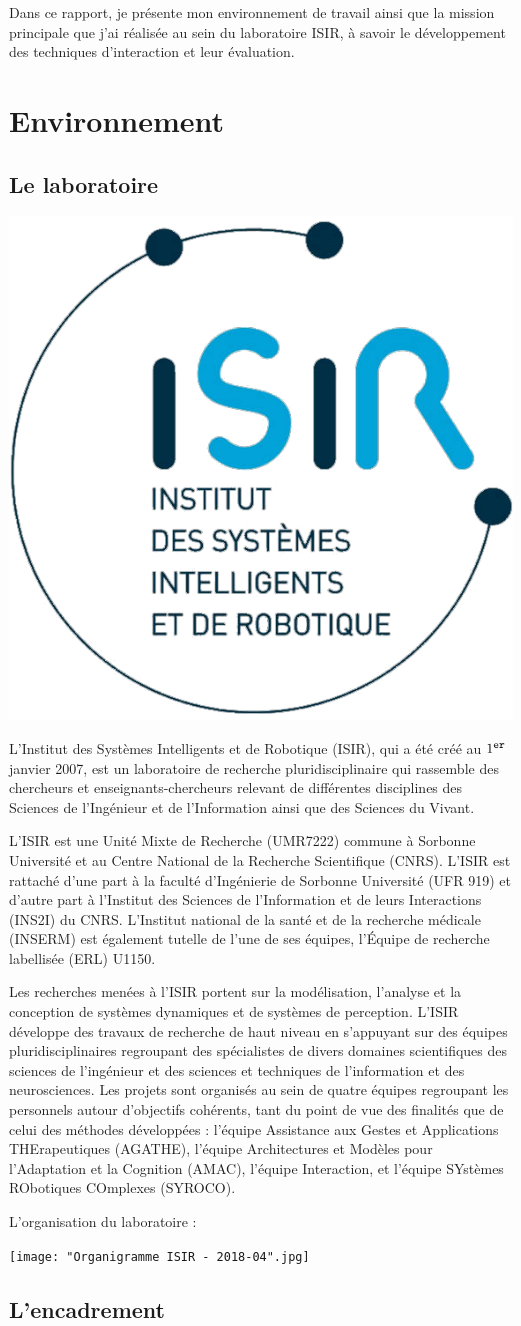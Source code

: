 \documentclass[12pt,a4paper]{article}
\begin{document}
Dans ce rapport, je présente mon environnement de travail ainsi que la mission principale que j'ai réalisée au sein du laboratoire ISIR, à savoir le développement des techniques d'interaction et leur évaluation.
\section{Environnement}
\subsection{Le laboratoire}
\begin{center}
	\includegraphics[width=.3\linewidth]{ISIR.png}
\end{center}
L'Institut des Systèmes Intelligents et de Robotique (ISIR), qui a été créé au $1^{\texttt{\footnotesize er}}$ janvier 2007, est un laboratoire de recherche pluridisciplinaire qui rassemble des chercheurs et enseignants-chercheurs relevant de différentes disciplines des Sciences de l’Ingénieur et de l’Information ainsi que des Sciences du Vivant.

L’ISIR est une Unité Mixte de Recherche (UMR7222) commune à Sorbonne Université et au Centre National de la Recherche Scientifique (CNRS). L'ISIR est rattaché d’une part à la faculté d’Ingénierie de Sorbonne Université (UFR 919) et d’autre part à l’Institut des Sciences de l'Information et de leurs Interactions (INS2I) du CNRS. L’Institut national de la santé et de la recherche médicale (INSERM) est également tutelle de l'une de ses équipes, l’Équipe de recherche labellisée (ERL) U1150.

Les recherches menées à l'ISIR portent sur la modélisation, l'analyse et la conception de systèmes dynamiques et de systèmes de perception. L'ISIR développe des travaux de recherche de haut niveau en s'appuyant sur des équipes pluridisciplinaires regroupant des spécialistes de divers domaines scientifiques des sciences de l'ingénieur et des sciences et techniques de l'information et des neurosciences. Les projets sont organisés au sein de quatre équipes regroupant les personnels autour d'objectifs cohérents, tant du point de vue des finalités que de celui des méthodes développées :  l'équipe Assistance aux Gestes et Applications THErapeutiques (AGATHE), l'équipe Architectures et Modèles pour l'Adaptation et la Cognition (AMAC), l'équipe Interaction, et l'équipe SYstèmes RObotiques COmplexes (SYROCO).

L'organisation du laboratoire :\\
\begin{center}
	\texttt{[image: "Organigramme ISIR - 2018-04".jpg]}
\end{center}
\subsection{L'encadrement}
\end{document}
